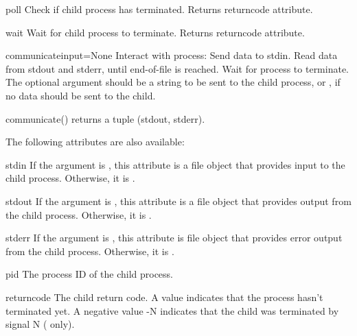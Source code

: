 \begin{methoddesc}{poll}{}
Check if child process has terminated.  Returns returncode
attribute.
\end{methoddesc}

\begin{methoddesc}{wait}{}
Wait for child process to terminate.  Returns returncode attribute.
\end{methoddesc}

\begin{methoddesc}{communicate}{input=None}
Interact with process: Send data to stdin.  Read data from stdout and
stderr, until end-of-file is reached.  Wait for process to terminate.
The optional  argument should be a string to be sent to the
child process, or , if no data should be sent to the child.

communicate() returns a tuple (stdout, stderr).

\end{methoddesc}

The following attributes are also available:

\begin{memberdesc}{stdin}
If the  argument is , this attribute is a file
object that provides input to the child process.  Otherwise, it is
.
\end{memberdesc}

\begin{memberdesc}{stdout}
If the  argument is , this attribute is a file
object that provides output from the child process.  Otherwise, it is
.
\end{memberdesc}

\begin{memberdesc}{stderr}
If the  argument is , this attribute is file
object that provides error output from the child process.  Otherwise,
it is .
\end{memberdesc}

\begin{memberdesc}{pid}
The process ID of the child process.
\end{memberdesc}

\begin{memberdesc}{returncode}
The child return code.  A  value indicates that the process
hasn't terminated yet.  A negative value -N indicates that the child
was terminated by signal N (\UNIX{} only).
\end{memberdesc}


